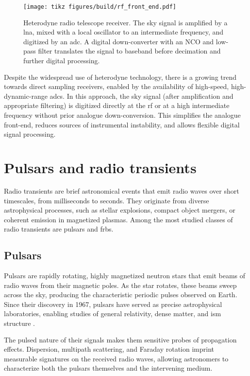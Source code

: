 \begin{figure}[h!]
	\centering
	\texttt{[image: tikz figures/build/rf\_front\_end.pdf]}
	\caption[Heterodyne receiver]{Heterodyne radio telescope receiver. The sky signal is amplified by a \gls{lna}, mixed with a local oscillator to an intermediate frequency, and digitized by an \gls{adc}. A digital down-converter with an NCO and low-pass filter translates the signal to baseband before decimation and further digital processing.}
	\label{fig:heterodyne_receiver}
\end{figure}

Despite the widespread use of heterodyne technology, there is a growing trend towards direct sampling receivers, enabled by the availability of high-speed, high-dynamic-range \glspl{adc}. In this approach, the sky signal (after amplification and appropriate filtering) is digitized directly at the \gls{rf} or at a high intermediate frequency without prior analogue down-conversion. This simplifies the analogue front-end, reduces sources of instrumental instability, and allows flexible digital signal processing.

\section{Pulsars and radio transients}
\label{sec:transient_astronomy}

Radio transients are brief astronomical events that emit radio waves over short timescales, from milliseconds to seconds. They originate from diverse astrophysical processes, such as stellar explosions, compact object mergers, or coherent emission in magnetized plasmas. Among the most studied classes of radio transients are pulsars and \glspl{frb}.

\subsection{Pulsars}

Pulsars are rapidly rotating, highly magnetized neutron stars that emit beams of radio waves from their magnetic poles. As the star rotates, these beams sweep across the sky, producing the characteristic periodic pulses observed on Earth. Since their discovery in 1967, pulsars have served as precise astrophysical laboratories, enabling studies of general relativity, dense matter, and \gls{ism} structure \citep{Lorimer2004}. 

The pulsed nature of their signals makes them sensitive probes of propagation effects. Dispersion, multipath scattering, and Faraday rotation imprint measurable signatures on the received radio waves, allowing astronomers to characterize both the pulsars themselves and the intervening medium.

